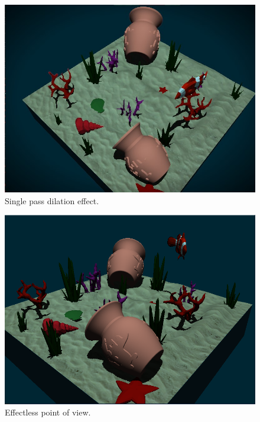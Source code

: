 \documentclass{article}
\begin{document}
\begin{figure}[h]
    \centering
    \includegraphics[width=\columnwidth]{imgs/dilation.jpg}
    \caption{Single pass dilation effect.}
    \label{fig:dilation_ms}
\end{figure}

\newpage

\begin{figure}[h]
    \centering
    \includegraphics[width=\columnwidth]{imgs/bright_sides.png}
    \caption{Effectless point of view.}
    \label{fig:no_blur}
\end{figure}
\end{document}
